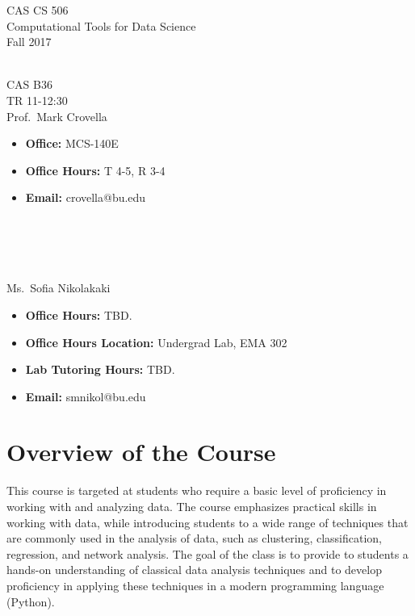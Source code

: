 \documentclass[11pt]{article}
\begin{document}
\sloppy 
\begin{center}
\LARGE CAS CS 506\\
\Large Computational Tools for Data Science\\
\Large\rm Fall 2017\\~\\
\end{center}

 CAS B36\\[\baselineskip]
 TR 11-12:30
\\[\baselineskip] 

 Prof.\ Mark Crovella\\[0.75\baselineskip]
\begin{minipage}[t]{0.60\textwidth}
\begin{itemize}
\item {\bf Office:} MCS-140E
\item {\bf Office Hours:} {\small T 4-5, R 3-4}
\item {\bf Email:} crovella@bu.edu
\end{itemize}
\end{minipage}
~\\~\\~\\~\\
  Ms.\ Sofia Nikolakaki\\[0.75\baselineskip]
 \begin{minipage}[t]{0.60\textwidth}
 \begin{itemize}
 \item {\bf Office Hours:} {\small TBD.}
 \item {\bf Office Hours Location:} Undergrad Lab, EMA 302
 \item {\bf Lab Tutoring Hours:} {\small TBD.}
 \item {\bf Email:} smnikol@bu.edu
 \end{itemize}
 \end{minipage}

\section*{Overview of the Course}

This course is targeted at students who require a basic level of
proficiency in working with and analyzing data.  The course emphasizes
practical skills in working with data, while introducing students to a
wide range of techniques that are commonly used in the analysis of data,
such as clustering, classification, regression, and network analysis.
The goal of the class is to provide to students a hands-on understanding
of classical data analysis techniques and to develop proficiency in
applying these techniques in a modern programming language (Python). 
\end{document}
